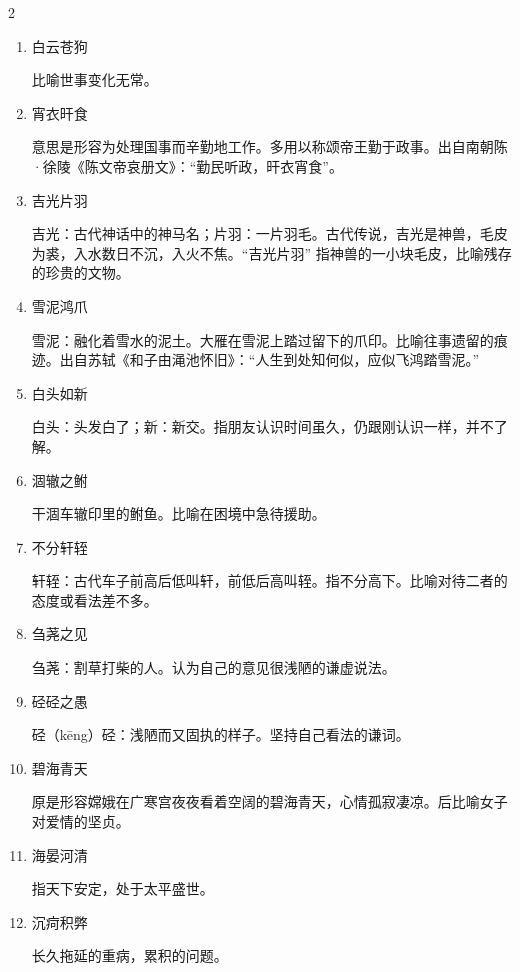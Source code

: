 \documentclass[final,oneside]{ctexbook}
\begin{document}
\begin{multicols}{2}
\begin{enumerate}
    \item 白云苍狗

      比喻世事变化无常。

    \item 宵衣旰食

      意思是形容为处理国事而辛勤地工作。多用以称颂帝王勤于政事。出自南朝陈·徐陵《陈文帝哀册文》：“勤民听政，旰衣宵食”。

    \item 吉光片羽

      吉光：古代神话中的神马名；片羽：一片羽毛。古代传说，吉光是神兽，毛皮为裘，入水数日不沉，入火不焦。“吉光片羽” 指神兽的一小块毛皮，比喻残存的珍贵的文物。

    \item 雪泥鸿爪

      雪泥：融化着雪水的泥土。大雁在雪泥上踏过留下的爪印。比喻往事遗留的痕迹。出自苏轼《和子由渑池怀旧》：“人生到处知何似，应似飞鸿踏雪泥。”

    \item 白头如新

      白头：头发白了；新：新交。指朋友认识时间虽久，仍跟刚认识一样，并不了解。

    \item 涸辙之鲋

      干涸车辙印里的鲋鱼。比喻在困境中急待援助。

    \item 不分轩轾

      轩轾：古代车子前高后低叫轩，前低后高叫轾。指不分高下。比喻对待二者的态度或看法差不多。

    \item 刍荛之见

      刍荛：割草打柴的人。认为自己的意见很浅陋的谦虚说法。

    \item 硁硁之愚

      硁（kēng）硁：浅陋而又固执的样子。坚持自己看法的谦词。

    \item 碧海青天

      原是形容嫦娥在广寒宫夜夜看着空阔的碧海青天，心情孤寂凄凉。后比喻女子对爱情的坚贞。

    \item 海晏河清

      指天下安定，处于太平盛世。

    \item 沉疴积弊

      长久拖延的重病，累积的问题。


\end{enumerate}
\end{multicols}
\end{document}
